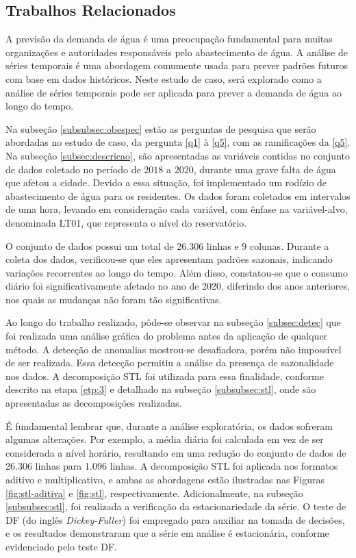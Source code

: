 \subsection{Trabalhos Relacionados}\label{subsec:estudo-de-caso-base}


A previsão da demanda de água é uma preocupação fundamental para muitas organizações e autoridades responsáveis pelo abastecimento de água. A análise de séries temporais é uma abordagem comumente usada para prever padrões futuros com base em dados históricos. Neste estudo de caso, será explorado como a análise de séries temporais pode ser aplicada para prever a demanda de água ao longo do tempo.



Na subseção \ref{subsubsec:obespec} estão as perguntas de pesquisa que serão abordadas no estudo de caso, da pergunta \ref{q1} à \ref{q5}, com as ramificações da \ref{q5}.
Na subseção \ref{subsec:descricao}, são apresentadas as variáveis contidas no conjunto de dados coletado no período de $2018$ a $2020$, durante uma grave falta de água que afetou a cidade. Devido a essa situação, foi implementado um rodízio de abastecimento de água para os residentes. Os dados foram coletados em intervalos de uma hora, levando em consideração cada variável, com ênfase na variável-alvo, denominada LT01, que representa o nível do reservatório.

O conjunto de dados possui um total de $26.306$ linhas e $9$ colunas. Durante a coleta dos dados, verificou-se que eles apresentam padrões sazonais, indicando variações recorrentes ao longo do tempo. Além disso, constatou-se que o consumo diário foi significativamente afetado no ano de 2020, diferindo dos anos anteriores, nos quais as mudanças não foram tão significativas.

Ao longo do trabalho realizado, pôde-se observar na subseção \ref{subsec:detec} que foi realizada uma análise gráfica do problema antes da aplicação de qualquer método. A detecção de anomalias mostrou-se desafiadora, porém não impossível de ser realizada. Essa detecção permitiu a análise da presença de sazonalidade nos dados. A decomposição STL foi utilizada para essa finalidade, conforme descrito na etapa \ref{etp:3} e detalhado na subseção \ref{subsubsec:stl}, onde são apresentadas as decomposições realizadas.

É fundamental lembrar que, durante a análise exploratória, os dados sofreram algumas alterações. Por exemplo, a média diária foi calculada em vez de ser considerada a nível horário, resultando em uma redução do conjunto de dados de 26.306 linhas para 1.096 linhas. A decomposição STL foi aplicada nos formatos aditivo e multiplicativo, e ambas as abordagens estão ilustradas nas Figuras \ref{fig:stl-aditiva} e \ref{fig:stl}, respectivamente.
Adicionalmente, na subseção \ref{subsubsec:stl}, foi realizada a verificação da estacionariedade da série. O teste de DF (do inglês \textit{Dickey-Fuller}) foi empregado para auxiliar na tomada de decisões, e os resultados demonstraram que a série em análise é estacionária, conforme evidenciado pelo teste DF.



